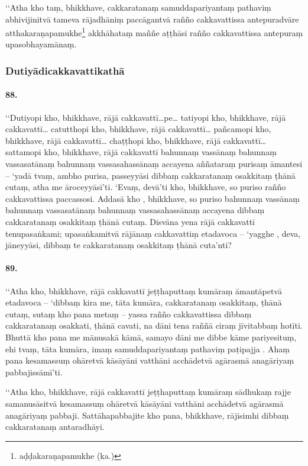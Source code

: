 ‘‘Atha kho taṃ, bhikkhave, cakkaratanaṃ samuddapariyantaṃ pathaviṃ abhivijinitvā tameva rājadhāniṃ paccāgantvā rañño cakkavattissa antepuradvāre atthakaraṇapamukhe\footnote{aḍḍakaraṇapamukhe (ka.)} akkhāhataṃ maññe aṭṭhāsi rañño cakkavattissa antepuraṃ upasobhayamānaṃ.

\subsubsection{Dutiyādicakkavattikathā}

\paragraph{88.} ‘‘Dutiyopi kho, bhikkhave, rājā cakkavattī…pe… tatiyopi kho, bhikkhave, rājā cakkavattī… catutthopi kho, bhikkhave, rājā cakkavattī… pañcamopi kho, bhikkhave, rājā cakkavattī… chaṭṭhopi kho, bhikkhave, rājā cakkavattī… sattamopi kho, bhikkhave, rājā cakkavattī bahunnaṃ vassānaṃ bahunnaṃ vassasatānaṃ bahunnaṃ vassasahassānaṃ accayena aññataraṃ purisaṃ āmantesi – ‘yadā tvaṃ, ambho purisa, passeyyāsi dibbaṃ cakkaratanaṃ osakkitaṃ ṭhānā cutaṃ, atha me āroceyyāsī’ti. ‘Evaṃ, devā’ti kho, bhikkhave, so puriso rañño cakkavattissa paccassosi. Addasā kho , bhikkhave, so puriso bahunnaṃ vassānaṃ bahunnaṃ vassasatānaṃ bahunnaṃ vassasahassānaṃ accayena dibbaṃ cakkaratanaṃ osakkitaṃ ṭhānā cutaṃ. Disvāna yena rājā cakkavattī tenupasaṅkami; upasaṅkamitvā rājānaṃ cakkavattiṃ etadavoca – ‘yagghe , deva, jāneyyāsi, dibbaṃ te cakkaratanaṃ osakkitaṃ ṭhānā cuta’nti?

\paragraph{89.} ‘‘Atha kho, bhikkhave, rājā cakkavattī jeṭṭhaputtaṃ kumāraṃ āmantāpetvā etadavoca – ‘dibbaṃ kira me, tāta kumāra, cakkaratanaṃ osakkitaṃ, ṭhānā cutaṃ, sutaṃ kho pana metaṃ – yassa rañño cakkavattissa dibbaṃ cakkaratanaṃ osakkati, ṭhānā cavati, na dāni tena raññā ciraṃ jīvitabbaṃ hotīti. Bhuttā kho pana me mānusakā kāmā, samayo dāni me dibbe kāme pariyesituṃ, ehi tvaṃ, tāta kumāra, imaṃ samuddapariyantaṃ pathaviṃ paṭipajja . Ahaṃ pana kesamassuṃ ohāretvā kāsāyāni vatthāni acchādetvā agārasmā anagāriyaṃ pabbajissāmī’ti.

‘‘Atha kho, bhikkhave, rājā cakkavattī jeṭṭhaputtaṃ kumāraṃ sādhukaṃ rajje samanusāsitvā kesamassuṃ ohāretvā kāsāyāni vatthāni acchādetvā agārasmā anagāriyaṃ pabbaji. Sattāhapabbajite kho pana, bhikkhave, rājisimhi dibbaṃ cakkaratanaṃ antaradhāyi.

